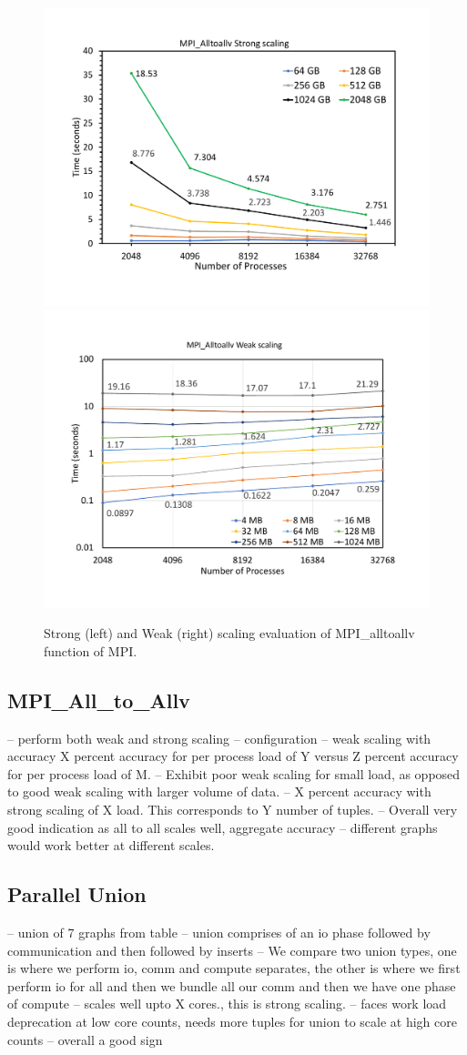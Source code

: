 \begin{figure}[t]
	{\includegraphics[width=.50\textwidth,  trim={0cm 0cm 0cm 0cm, 
			clip}]{results/all_to_all_strong.pdf}}\hfill%
	{\includegraphics[width=.50\textwidth,  trim={0cm 0cm 0cm 0cm,
			clip}]{results/all_to_all_weak.pdf}}\hfill%
	\centering
	\caption{Strong (left) and Weak (right) scaling evaluation of MPI\_alltoallv function of MPI.}
	\label{fig:all_to_all}
\end{figure}


\subsection{MPI\_All\_to\_Allv}
\label{sec:all_to_all}

-- perform both weak and strong scaling
-- configuration
-- weak scaling with accuracy X percent accuracy for per process load of Y versus Z percent accuracy for per process load of M.
-- Exhibit poor weak scaling for small load, as opposed to good weak scaling with larger volume of data.
-- X percent accuracy with strong scaling of X load. This corresponds to Y number of tuples.
-- Overall very good indication as all to all scales well, aggregate accuracy
-- different graphs would work better at different scales.

\subsection{Parallel Union}
\label{sec:union}
-- union of 7 graphs from table
-- union comprises of an io phase followed by communication and then followed by inserts
-- We compare two union types, one is where we perform io, comm and compute separates, the other is where we first perform io for all and then we bundle all our comm and then we have one phase of compute
-- scales well upto X cores., this is strong scaling.
-- faces work load deprecation at low core counts, needs more tuples for union to scale at high core counts
-- overall a good sign


